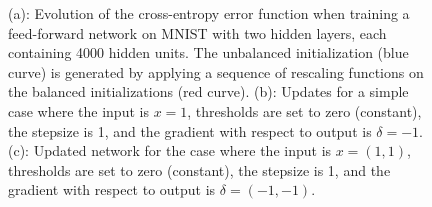 \documentclass[11pt]{article}
\begin{document}
\begin{figure}[t!]
\hspace{0.12in}
\hspace{0.5in}
 \newline
 \caption{ \small (a): Evolution of the cross-entropy error function when training a 
feed-forward network on MNIST with two hidden layers, each containing 4000 hidden units.
The unbalanced initialization (blue curve) is generated by applying a sequence of rescaling functions on the balanced initializations (red curve). (b): Updates for a simple case where the input is $x=1$, 
thresholds are set to zero (constant), the stepsize is 1, and the gradient with respect to output is $\delta = -1$. (c): Updated network for the case where the input is $x=(1,1)$, thresholds are set to zero (constant), the stepsize is 1, and the gradient with respect to output is $\delta=(-1,-1)$. }
 \label{fig:unbalanced}
\end{figure}
\end{document}
